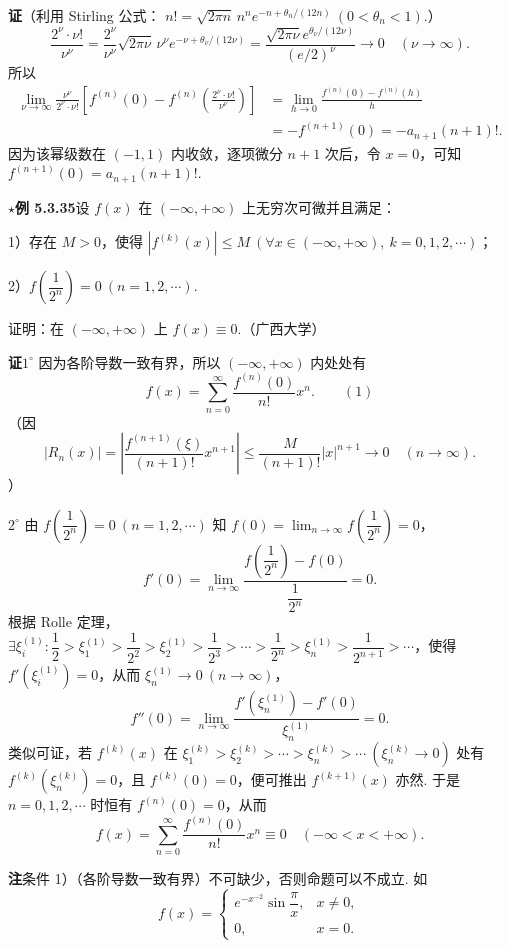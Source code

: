 \documentclass[UTF8,12pt,a4paper,fontset=fandol]{ctexart}
\begin{document}
\noindent\textbf{证}\quad （利用 Stirling 公式：
$n!=\sqrt{2\pi n}\,n^ne^{-n+\theta_n/(12n)}\ (0<\theta_n<1)$.）
\[
  \frac{2^\nu\cdot\nu!}{\nu^\nu}
  =\frac{2^\nu}{\nu^\nu}\sqrt{2\pi\nu}\,\nu^\nu e^{-\nu+\theta_\nu/(12\nu)}
  =\frac{\sqrt{2\pi\nu}e^{\theta_\nu/(12\nu)}}{\left(e/2\right)^\nu}\to0
  \quad(\nu\to\infty).
\]
所以
\[
\begin{aligned}
\lim_{\nu\to\infty}\frac{\nu^\nu}{2^\nu\cdot\nu!}
\left[f^{(n)}(0)-f^{(n)}\left(\frac{2^\nu\cdot\nu!}{\nu^\nu}\right)\right]
&=\lim_{h\to0}\frac{f^{(n)}(0)-f^{(n)}(h)}h\\
&=-f^{(n+1)}(0)=-a_{n+1}(n+1)!.
\end{aligned}
\]
因为该幂级数在 $(-1,1)$ 内收敛，逐项微分 $n+1$ 次后，令 $x=0$，可知
$f^{(n+1)}(0)=a_{n+1}(n+1)!$.

\noindent\(\star\)\textbf{例 5.3.35}\quad 设 $f(x)$ 在 $(-\infty,+\infty)$ 上无穷次可微并且满足：

1）存在 $M>0$，使得 $|f^{(k)}(x)|\le M\ (\forall x\in(-\infty,+\infty),\ k=0,1,2,\cdots)$；

2）$f\left(\dfrac1{2^n}\right)=0\ (n=1,2,\cdots)$.

证明：在 $(-\infty,+\infty)$ 上 $f(x)\equiv0$.（广西大学）

\noindent\textbf{证}\quad $1^\circ$ 因为各阶导数一致有界，所以 $(-\infty,+\infty)$ 内处处有
\[
  f(x)=\sum_{n=0}^{\infty}\frac{f^{(n)}(0)}{n!}x^n. \qquad(1)
\]
（因
\[
  |R_n(x)|=\left|\frac{f^{(n+1)}(\xi)}{(n+1)!}x^{n+1}\right|
  \le\frac{M}{(n+1)!}|x|^{n+1}\to0\quad(n\to\infty).
\]）

$2^\circ$ 由 $f\left(\dfrac1{2^n}\right)=0\ (n=1,2,\cdots)$ 知
$f(0)=\displaystyle\lim_{n\to\infty}f\left(\dfrac1{2^n}\right)=0$，
\[
  f'(0)=\lim_{n\to\infty}\frac{f\left(\dfrac1{2^n}\right)-f(0)}{\dfrac1{2^n}}=0.
\]
根据 Rolle 定理，$\exists\xi_i^{(1)}:\dfrac12>\xi_1^{(1)}>\dfrac1{2^2}>\xi_2^{(1)}>\dfrac1{2^3}>\cdots>\dfrac1{2^n}>\xi_n^{(1)}>\dfrac1{2^{n+1}}>\cdots$，使得
$f'(\xi_i^{(1)})=0$，从而 $\xi_n^{(1)}\to0\ (n\to\infty)$，
\[
  f''(0)=\lim_{n\to\infty}\frac{f'(\xi_n^{(1)})-f'(0)}{\xi_n^{(1)}}=0.
\]
类似可证，若 $f^{(k)}(x)$ 在
$\xi_1^{(k)}>\xi_2^{(k)}>\cdots>\xi_n^{(k)}>\cdots\ (\xi_n^{(k)}\to0)$ 处有
$f^{(k)}(\xi_n^{(k)})=0$，且 $f^{(k)}(0)=0$，便可推出 $f^{(k+1)}(x)$ 亦然. 于是
$n=0,1,2,\cdots$ 时恒有 $f^{(n)}(0)=0$，从而
\[
  f(x)=\sum_{n=0}^{\infty}\frac{f^{(n)}(0)}{n!}x^n\equiv0
  \quad(-\infty<x<+\infty).
\]

\noindent\textbf{注}\quad 条件 1）（各阶导数一致有界）不可缺少，否则命题可以不成立. 如
\[
  f(x)=
  \begin{cases}
    e^{-x^{-2}}\sin\dfrac\pi x,&x\ne0,\\
    0,&x=0.
  \end{cases}
\]
\end{document}
